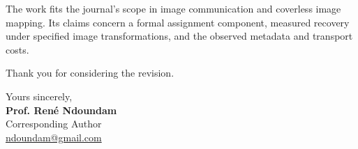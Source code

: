 \documentclass[12pt,a4paper]{article}
\begin{document}
The work fits the journal's scope in image communication and coverless image mapping. Its claims concern a formal assignment component, measured recovery under specified image transformations, and the observed metadata and transport costs.

Thank you for considering the revision.

Yours sincerely,\\[8pt]
\textbf{Prof. Ren\'e Ndoundam}\\
Corresponding Author\\
\href{mailto:ndoundam@gmail.com}{ndoundam@gmail.com}
\end{document}
